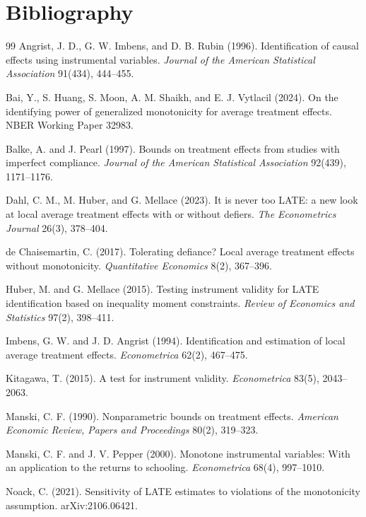 \documentclass[11pt]{article}
\theoremstyle{definition}
\theoremstyle{plain}
\theoremstyle{remark}
\begin{document}
\section*{Bibliography}
\begin{thebibliography}{99}
Angrist, J. D., G. W. Imbens, and D. B. Rubin (1996).
\newblock Identification of causal effects using instrumental variables.
\newblock \emph{Journal of the American Statistical Association} 91(434), 444--455.

Bai, Y., S. Huang, S. Moon, A. M. Shaikh, and E. J. Vytlacil (2024).
\newblock On the identifying power of generalized monotonicity for average treatment effects.
\newblock NBER Working Paper 32983.

Balke, A. and J. Pearl (1997).
\newblock Bounds on treatment effects from studies with imperfect compliance.
\newblock \emph{Journal of the American Statistical Association} 92(439), 1171--1176.

Dahl, C. M., M. Huber, and G. Mellace (2023).
\newblock It is never too LATE: a new look at local average treatment effects with or without defiers.
\newblock \emph{The Econometrics Journal} 26(3), 378--404.

de Chaisemartin, C. (2017).
\newblock Tolerating defiance? Local average treatment effects without monotonicity.
\newblock \emph{Quantitative Economics} 8(2), 367--396.

Huber, M. and G. Mellace (2015).
\newblock Testing instrument validity for LATE identification based on inequality moment constraints.
\newblock \emph{Review of Economics and Statistics} 97(2), 398--411.

Imbens, G. W. and J. D. Angrist (1994).
\newblock Identification and estimation of local average treatment effects.
\newblock \emph{Econometrica} 62(2), 467--475.

Kitagawa, T. (2015).
\newblock A test for instrument validity.
\newblock \emph{Econometrica} 83(5), 2043--2063.

Manski, C. F. (1990).
\newblock Nonparametric bounds on treatment effects.
\newblock \emph{American Economic Review, Papers and Proceedings} 80(2), 319--323.

Manski, C. F. and J. V. Pepper (2000).
\newblock Monotone instrumental variables: With an application to the returns to schooling.
\newblock \emph{Econometrica} 68(4), 997--1010.

Noack, C. (2021).
\newblock Sensitivity of LATE estimates to violations of the monotonicity assumption.
\newblock arXiv:2106.06421.
\end{thebibliography}
\end{document}
